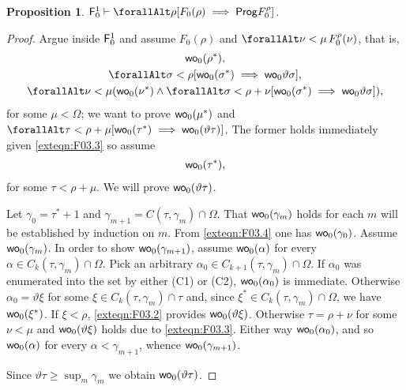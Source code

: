 \documentclass[UKenglish,cleveref,DIV=12]{scrartcl}
\let\forall\forallAlt
\newtheorem{proposition}[lemma]{Proposition}
\theoremstyle{definition}
\theoremstyle{definition}
\begin{document}
\begin{proposition}\label{extprop:F0genwellordering}
  $\F_0^1\proves \forall\rho[F_0(\rho)\implies \Prog  F_0^\rho]$.
\end{proposition}
\begin{proof}
Argue inside $\mathsf{F}_0^1$ and assume $F_0(\rho)$ and $\forall\nu<\mu\,F_0^\rho(\nu)$, that is,
\begin{gather}
  \wo_0(\rho^*),\label{exteqn:F03.1}\\
  \forall\sigma<\rho[\wo_0(\sigma^*)\implies\wo_0\vartheta\sigma],\label{exteqn:F03.2}\\
  \forall\nu<\mu(\wo_0(\nu^*)\land\forall\sigma<\rho+\nu[\wo_0(\sigma^*)\implies \wo_0\vartheta\sigma]),\label{exteqn:F03.3}
\end{gather}
for some $\mu<\Omega$; we want to prove $\mathsf{wo}_0(\mu^*)$ and $\forall\tau<\rho+\mu[\wo_0(\tau^*)\implies \wo_0(\vartheta\tau)]$. The former holds immediately given \cref{exteqn:F03.3} so assume
\begin{gather}
  \mathsf{wo}_0(\tau^*),\label{exteqn:F03.4}
\end{gather}
for some $\tau<\rho+\mu$. We will prove $\mathsf{wo}_0(\vartheta\tau)$.

Let $\gamma_0=\tau^*+1$ and $\gamma_{m+1} = C(\tau,\gamma_m)\cap \Omega$. That $\mathsf{wo}_0(\gamma_m)$ holds for each $m$ will be established by induction on $m$. From
\cref{exteqn:F03.4} one has $\mathsf{wo}_0(\gamma_0)$. Assume $\mathsf{wo}_0(\gamma_m)$. In
order to show $\mathsf{wo}_0(\gamma_{m+1})$, assume $\mathsf{wo}_0(\alpha)$ for every
$\alpha\in C_k(\tau,\gamma_m)\cap\Omega$. Pick an arbitrary $\alpha_0\in
C_{k+1}(\tau,\gamma_m)\cap\Omega$. If $\alpha_0$ was enumerated into the set by
either (C1) or (C2), $\mathsf{wo}_0(\alpha_0)$ is immediate. Otherwise
$\alpha_0=\vartheta\xi$ for some $\xi\in C_k(\tau,\gamma_m)\cap\tau$ and, since
$\xi^*\in C_k(\tau,\gamma_m)\cap\Omega$, we have $\mathsf{wo}_0(\xi^*)$. If $\xi<\rho$,
\cref{exteqn:F03.2} provides $\mathsf{wo}_0(\vartheta\xi)$. Otherwise $\tau=\rho+\nu$
for some $\nu<\mu$ and $\mathsf{wo}_0(\vartheta\xi)$ holds due to \cref{exteqn:F03.3}.
Either way $\mathsf{wo}_0(\alpha_0)$, and so $\mathsf{wo}_0(\alpha)$ for every
$\alpha<\gamma_{m+1}$, whence $\mathsf{wo}_0(\gamma_{m+1})$.

Since $\vartheta\tau\ge\sup_m\gamma_m$ we obtain $\mathsf{wo}_0(\vartheta\tau)$.
\end{proof}
\end{document}
